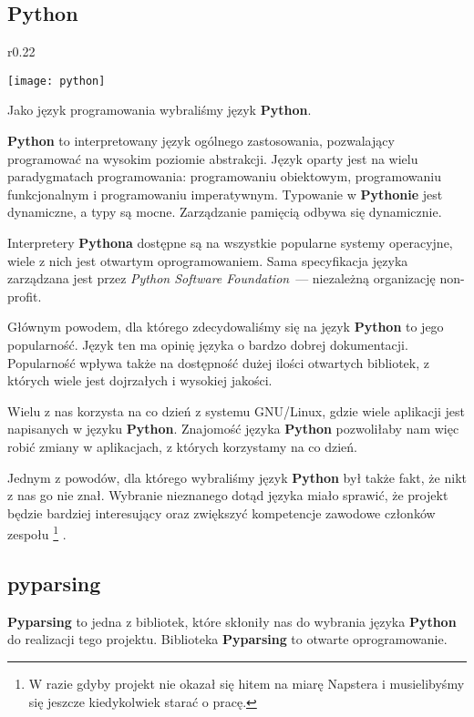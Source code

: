 \subsection{Python}

\begin{wrapfigure}{r}{0.22\textwidth}
  \begin{center}
    \texttt{[image: python]}
  \end{center}
\end{wrapfigure}
Jako język programowania wybraliśmy język \textbf{Python}.

\textbf{Python} to interpretowany język ogólnego zastosowania, pozwalający programować na wysokim poziomie abstrakcji.
Język oparty jest na wielu paradygmatach programowania: programowaniu obiektowym, programowaniu funkcjonalnym i programowaniu imperatywnym.
Typowanie w \textbf{Pythonie} jest dynamiczne, a typy są mocne.
Zarządzanie pamięcią odbywa się dynamicznie.

Interpretery \textbf{Pythona} dostępne są na wszystkie popularne systemy operacyjne, wiele z nich jest otwartym oprogramowaniem.
Sama specyfikacja języka zarządzana jest przez \emph{Python Software Foundation}~--- niezależną organizację non-profit.

Głównym powodem, dla którego zdecydowaliśmy się na język \textbf{Python} to jego popularność.
Język ten ma opinię języka o bardzo dobrej dokumentacji.
Popularność wpływa także na dostępność dużej ilości otwartych bibliotek, z których wiele jest dojrzałych i wysokiej jakości.

Wielu z nas korzysta na co dzień z systemu GNU/Linux, gdzie wiele aplikacji jest napisanych w języku \textbf{Python}.
Znajomość języka \textbf{Python} pozwoliłaby nam więc robić zmiany w aplikacjach, z których korzystamy na co dzień.

Jednym z powodów, dla którego wybraliśmy język \textbf{Python} był także fakt, że nikt z nas go nie znał.
Wybranie nieznanego dotąd języka miało sprawić, że projekt będzie bardziej interesujący oraz zwiększyć kompetencje zawodowe członków zespołu
\footnote{W razie gdyby projekt nie okazał się hitem na miarę Napstera i musielibyśmy się jeszcze kiedykolwiek starać o pracę.}
.

\subsection{pyparsing}
\textbf{Pyparsing} to jedna z bibliotek, które skłoniły nas do wybrania języka \textbf{Python} do realizacji tego projektu.
Biblioteka \textbf{Pyparsing} to otwarte oprogramowanie.

